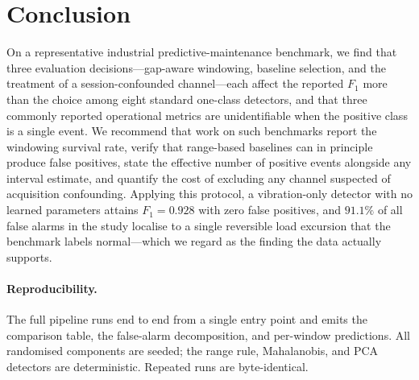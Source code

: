 \documentclass[twocolumn,10pt]{article}
\begin{document}
\section{Conclusion}

On a representative industrial predictive-maintenance benchmark, we find that
three evaluation decisions---gap-aware windowing, baseline selection, and the
treatment of a session-confounded channel---each affect the reported $F_1$ more
than the choice among eight standard one-class detectors, and that three
commonly reported operational metrics are unidentifiable when the positive
class is a single event. We recommend that work on such benchmarks report the
windowing survival rate, verify that range-based baselines can in principle
produce false positives, state the effective number of positive events
alongside any interval estimate, and quantify the cost of excluding any channel
suspected of acquisition confounding. Applying this protocol, a vibration-only
detector with no learned parameters attains $F_1 = 0.928$ with zero false
positives, and $91.1\%$ of all false alarms in the study localise to a single
reversible load excursion that the benchmark labels normal---which we regard as
the finding the data actually supports.

\paragraph{Reproducibility.} The full pipeline runs end to end from a single
entry point and emits the comparison table, the false-alarm decomposition, and
per-window predictions. All randomised components are seeded; the range rule,
Mahalanobis, and PCA detectors are deterministic. Repeated runs are
byte-identical.
\end{document}
